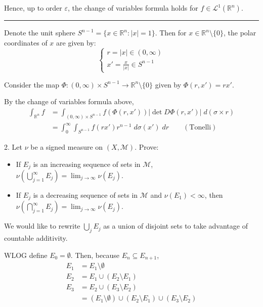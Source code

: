 \documentclass[12pt]{article}
\newcommand{\R}{\mathbb{R}}
\newcommand{\abs}[1]{\left\vert #1 \right\vert}
\newcommand{\ep}{\varepsilon}
\newcommand{\M}{\mathcal{M}}
\renewcommand{\L}{\mathcal{L}}
\newcommand{\sub}{\subseteq}
\renewcommand{\div}{\vspace*{10pt}\hrule\vspace*{10pt}}
\begin{document}
        Hence, up to order $\ep$, the change of variables formula holds for $f \in \L^1(\R^n)$.

        \div 

        Denote the unit sphere $S^{n-1} = \{x \in \R^n: \abs{x} = 1\}$. Then for $x \in \R^n \setminus \{0\}$, the polar coordinates of $x$ are given by:
        \[\begin{cases}
            r = \abs{x} \in (0, \infty)\\ 
            x' = \frac{x}{\abs{x}} \in S^{n-1}
        \end{cases}\]

        Consider the map $\Phi: (0, \infty) \times S^{n-1} \to \R^n\setminus \{0\}$ given by $\Phi(r, x') = rx'$.

        By the change of variables formula above,
        \begin{align*}
            \int_{\R^n} f &= \int_{(0, \infty) \times S^{n-1}} f(\Phi(r, x')) \abs{\det D\Phi(r, x')} \; d(\sigma \times r)\\ 
            &= \int_0^{\infty} \int_{S^{n-1}} f(rx') r^{n-1} \; d\sigma(x') \; dr \qquad (\text{Tonelli})
        \end{align*}

    \color{black}
\pagebreak 

2. Let $\nu$ be a signed measure on $(X, \M)$. Prove:
\begin{itemize}
    \item If $E_j$ is an increasing sequence of sets in $\M$, $\nu\left(\bigcup_{j=1}^\infty E_j\right) = \lim_{j\to\infty} \nu(E_j)$.
    \item If $E_j$ is a decreasing sequence of sets in $\M$ and $\nu(E_1) < \infty$, then $\nu\left(\bigcap_{j=1}^\infty E_j\right) = \lim_{j\to\infty} \nu(E_j)$.
\end{itemize}

    \color{blue}
        We would like to rewrite $\bigcup_j E_j$ as a union of disjoint sets to take advantage of countable additivity. 
        
        WLOG define $E_0 = \emptyset$. Then, because $E_n \sub E_{n+1}$,
        \begin{align*}
            E_1 &= E_1 \setminus \emptyset\\ 
            E_2 &= E_1 \cup (E_2 \setminus E_1)\\ 
            E_3 &= E_2 \cup (E_3 \setminus E_2)\\ 
                &= (E_1 \setminus \emptyset) \cup (E_2 \setminus E_1) \cup (E_3 \setminus E_2) 
        \end{align*}
    
\end{document}
